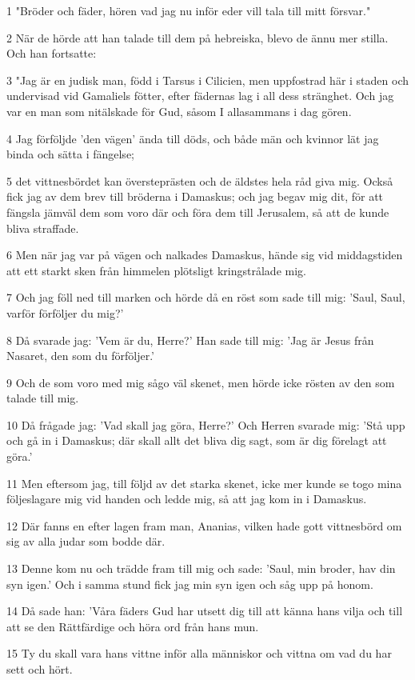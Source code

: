 \par 1 "Bröder och fäder, hören vad jag nu inför eder vill tala till mitt försvar."
\par 2 När de hörde att han talade till dem på hebreiska, blevo de ännu mer stilla. Och han fortsatte:
\par 3 "Jag är en judisk man, född i Tarsus i Cilicien, men uppfostrad här i staden och undervisad vid Gamaliels fötter, efter fädernas lag i all dess stränghet. Och jag var en man som nitälskade för Gud, såsom I allasammans i dag gören.
\par 4 Jag förföljde 'den vägen' ända till döds, och både män och kvinnor lät jag binda och sätta i fängelse;
\par 5 det vittnesbördet kan översteprästen och de äldstes hela råd giva mig. Också fick jag av dem brev till bröderna i Damaskus; och jag begav mig dit, för att fängsla jämväl dem som voro där och föra dem till Jerusalem, så att de kunde bliva straffade.
\par 6 Men när jag var på vägen och nalkades Damaskus, hände sig vid middagstiden att ett starkt sken från himmelen plötsligt kringstrålade mig.
\par 7 Och jag föll ned till marken och hörde då en röst som sade till mig: 'Saul, Saul, varför förföljer du mig?'
\par 8 Då svarade jag: 'Vem är du, Herre?' Han sade till mig: 'Jag är Jesus från Nasaret, den som du förföljer.'
\par 9 Och de som voro med mig sågo väl skenet, men hörde icke rösten av den som talade till mig.
\par 10 Då frågade jag: 'Vad skall jag göra, Herre?' Och Herren svarade mig: 'Stå upp och gå in i Damaskus; där skall allt det bliva dig sagt, som är dig förelagt att göra.'
\par 11 Men eftersom jag, till följd av det starka skenet, icke mer kunde se togo mina följeslagare mig vid handen och ledde mig, så att jag kom in i Damaskus.
\par 12 Där fanns en efter lagen fram man, Ananias, vilken hade gott vittnesbörd om sig av alla judar som bodde där.
\par 13 Denne kom nu och trädde fram till mig och sade: 'Saul, min broder, hav din syn igen.' Och i samma stund fick jag min syn igen och såg upp på honom.
\par 14 Då sade han: 'Våra fäders Gud har utsett dig till att känna hans vilja och till att se den Rättfärdige och höra ord från hans mun.
\par 15 Ty du skall vara hans vittne inför alla människor och vittna om vad du har sett och hört.
